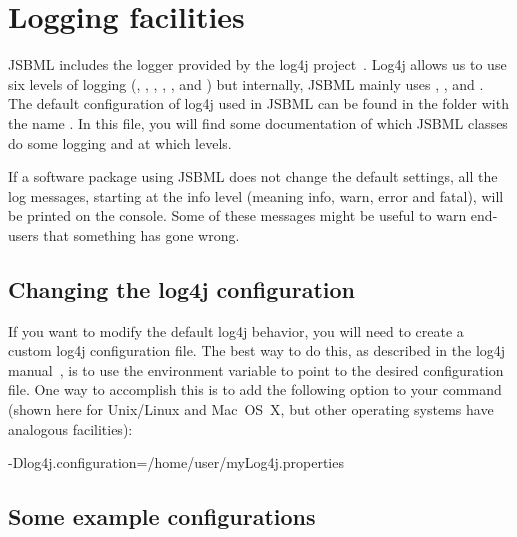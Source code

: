 \section{Logging facilities}
%


JSBML includes the logger provided by the log4j
project~\citep{log4j}.  Log4j allows us to use six levels of logging
(, , , , , and
) but internally, JSBML mainly uses , ,
and . The default configuration of log4j used in JSBML can be
found in the folder  with the name .
In this file, you will find some documentation of which JSBML classes do
some logging and at which levels.
 
If a software package using JSBML does not change the default settings, all
the log messages, starting at the info level (meaning info, warn, error and
fatal), will be printed on the console.  Some of these messages might be
useful to warn end-users that something has gone wrong.


\subsection{Changing the log4j configuration}


If you want to modify the default log4j behavior, you will need to create a
custom log4j configuration file. The best way to do this, as described in
the log4j manual~\citep{log4j}, is to use the environment variable
 to point to the desired configuration file. One
way to accomplish this is to add the following option to your 
command (shown here for Unix/Linux and Mac~OS~X, but other operating
systems have analogous facilities):

\begin{example}[style=bash, title={Command line option making log4j
    use a different configuration file.  This syntax applies to Unix-like
    systems.}] 
-Dlog4j.configuration=/home/user/myLog4j.properties
\end{example}


\subsection{Some example configurations}
%

